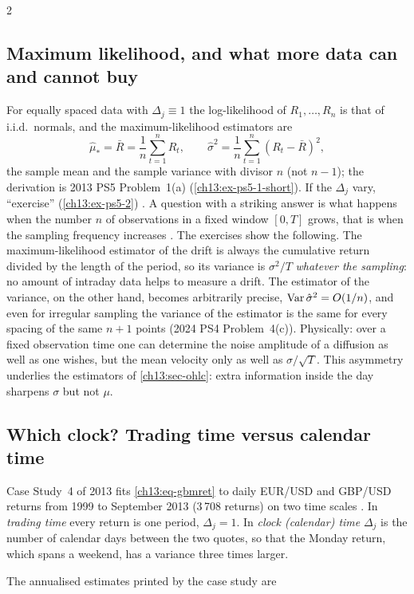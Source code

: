 \begin{paracol}{2}
\subsection{Maximum likelihood, and what more data can and cannot buy}
For equally spaced data with $\Delta_j\equiv1$ the log-likelihood of $R_1,\dots,R_n$ is that of i.i.d.\ normals, and the
maximum-likelihood estimators are 
\begin{equation}\label{ch13:eq-gbmmle}
  \hat\mu_*=\bar R=\frac1n\sum_{t=1}^nR_t,\qquad \hat\sigma^2=\frac1n\sum_{t=1}^n(R_t-\bar R)^2,
\end{equation}
the sample mean and the sample variance with divisor $n$ (not $n-1$); the derivation is 2013 PS5 Problem~1(a)
(\cref{ch13:ex-ps5-1-short}). If the $\Delta_j$ vary, ``exercise'' (\cref{ch13:ex-ps5-2}) . A question with a striking
answer is what happens when the number $n$ of observations in a fixed window $[0,T]$ grows, that is when the
sampling frequency increases . The exercises show the following. The maximum-likelihood
estimator of the drift is always the cumulative return divided by the length of the period, so its variance is
$\sigma^2/T$ \emph{whatever the sampling}: no amount of intraday data helps to measure a drift. The estimator of the
variance, on the other hand, becomes arbitrarily precise, $\operatorname{Var}\hat\sigma^2=O(1/n)$, and even for irregular sampling the
variance of the estimator is the same for every spacing of the same $n+1$ points (2024 PS4 Problem~4(c)).
Physically: over a fixed observation time one can determine the noise amplitude of a diffusion as well as one wishes, but the
mean velocity only as well as $\sigma/\sqrt T$. This asymmetry underlies the estimators of \cref{ch13:sec-ohlc}: extra
information inside the day sharpens $\sigma$ but not $\mu$.

\subsection{Which clock? Trading time versus calendar time}\label{ch13:sec-clock}
Case Study~4 of 2013 fits \eqref{ch13:eq-gbmret} to daily EUR/USD and GBP/USD returns from 1999 to September 2013 (3\,708 returns) on two time
scales . In \emph{trading time} every return is one period, $\Delta_j=1$. In \emph{clock (calendar) time}
$\Delta_j$ is the number of calendar days between the two quotes, so that the Monday return, which spans a weekend, has a variance
three times larger.
\begin{secondary}
The annualised estimates printed by the case study are


\end{secondary}
\end{paracol}

